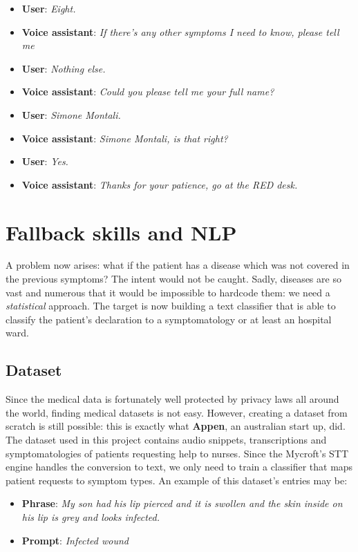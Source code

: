 \documentclass[conference]{IEEEtran}
\begin{document}
\begin{itemize}
    \item \textbf{User}: \textit{Eight.}
    \item \textbf{Voice assistant}: \textit{If there's any other symptoms I need to know, please tell me}
    \item \textbf{User}: \textit{Nothing else.}
    \item \textbf{Voice assistant}: \textit{Could you please tell me your full name?}
    \item \textbf{User}: \textit{Simone Montali.}
    \item \textbf{Voice assistant}: \textit{Simone Montali, is that right?}
    \item \textbf{User}: \textit{Yes.}
    \item \textbf{Voice assistant}: \textit{Thanks for your patience, go at the RED desk.}
\end{itemize}
\section{Fallback skills and NLP}
\label{sec:fallback}
A problem now arises: what if the patient has a disease which was not covered in the previous symptoms? The intent would not be caught. Sadly, diseases are so vast and numerous that it would be impossible to hardcode them: we need a \textit{statistical} approach. The target is now building a text classifier that is able to classify the patient's declaration to a symptomatology or at least an hospital ward.
\subsection{Dataset}
Since the medical data is fortunately well protected by privacy laws all around the world, finding medical datasets is not easy. However, creating a dataset from scratch is still possible: this is exactly what \textbf{Appen}, an australian start up, did. The dataset used in this project \cite{b2} contains audio snippets, transcriptions and symptomatologies of patients requesting help to nurses. Since the Mycroft's STT engine handles the conversion to text, we only need to train a classifier that maps patient requests to symptom types. An example of this dataset's entries may be:
\begin{itemize}
    \item \textbf{Phrase}: \textit{My son had his lip pierced and it is swollen and the skin inside
              on his lip is grey and looks infected.}
    \item \textbf{Prompt}: \textit{Infected wound}
\end{itemize}
\end{document}
